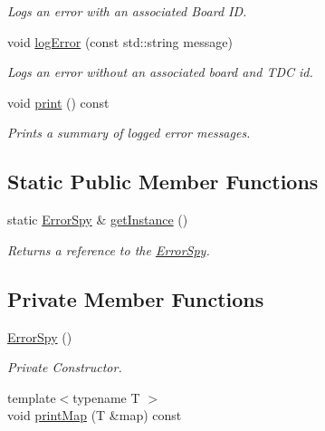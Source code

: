 \begin{DoxyCompactItemize}
\begin{DoxyCompactList}\small\item\em Logs an error with an associated Board ID. \end{DoxyCompactList}\item 
void \hyperlink{class_error_spy_a6bde4e271c13b6e31c657c4417127588}{log\+Error} (const std\+::string message)
\begin{DoxyCompactList}\small\item\em Logs an error without an associated board and T\+DC id. \end{DoxyCompactList}\item 
void \hyperlink{class_error_spy_a85e971684266e774c896ee681850614a}{print} () const
\begin{DoxyCompactList}\small\item\em Prints a summary of logged error messages. \end{DoxyCompactList}\end{DoxyCompactItemize}
\subsection*{Static Public Member Functions}
\begin{DoxyCompactItemize}
\item 
static \hyperlink{class_error_spy}{Error\+Spy} \& \hyperlink{class_error_spy_a154313e18c3c5e8bb8cba494e2eebdfd}{get\+Instance} ()
\begin{DoxyCompactList}\small\item\em Returns a reference to the \hyperlink{class_error_spy}{Error\+Spy}. \end{DoxyCompactList}\end{DoxyCompactItemize}
\subsection*{Private Member Functions}
\begin{DoxyCompactItemize}
\item 
\hyperlink{class_error_spy_a8d07ccabb00ac3925d94d77e7092bc99}{Error\+Spy} ()
\begin{DoxyCompactList}\small\item\em Private Constructor. \end{DoxyCompactList}\item 
{\footnotesize template$<$typename T $>$ }\\void \hyperlink{class_error_spy_abc5352997d5b107ac0662e7e087260a2}{print\+Map} (T \&map) const
\end{DoxyCompactItemize}
